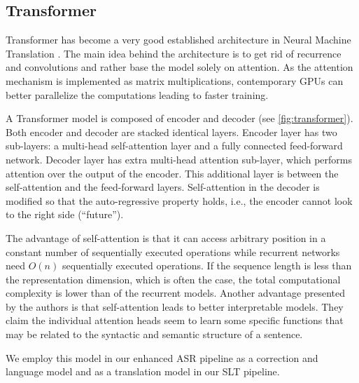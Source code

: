 \subsection{Transformer}
Transformer  has become a very good established architecture in Neural Machine Translation . The main idea behind the architecture is to get rid of recurrence and convolutions and rather base the model solely on attention. As the attention mechanism is implemented as matrix multiplications, contemporary GPUs can better parallelize the computations leading to faster training.

A Transformer model is composed of encoder and decoder (see \cref{fig:transformer}). Both encoder and decoder are stacked identical layers. Encoder layer has two sub-layers: a multi-head self-attention layer and a fully connected feed-forward network. Decoder layer has extra multi-head attention sub-layer, which performs attention over the output of the encoder. This additional layer is between the self-attention and the feed-forward layers. Self-attention in the decoder is modified so that the auto-regressive property holds, i.e., the encoder cannot look to the right side (``future'').

The advantage of self-attention is that it can access arbitrary position in a constant number of sequentially executed operations while recurrent networks need $O(n)$ sequentially executed operations. If the sequence length is less than the representation dimension, which is often the case, the total computational complexity is lower than of the recurrent models. Another advantage presented by the authors is that self-attention leads to better interpretable models. They claim the individual attention heads seem to learn some specific functions that may be related to the syntactic and semantic structure of a sentence.

We employ this model in our enhanced ASR pipeline as a correction and language model and as a translation model in our SLT pipeline. 

